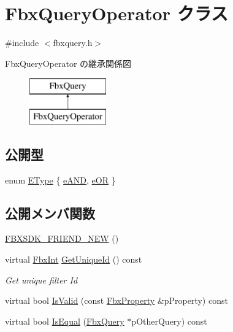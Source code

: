 \hypertarget{class_fbx_query_operator}{}\section{Fbx\+Query\+Operator クラス}
\label{class_fbx_query_operator}


{\ttfamily \#include $<$fbxquery.\+h$>$}

Fbx\+Query\+Operator の継承関係図\begin{figure}[H]
\begin{center}
\leavevmode
\includegraphics[height=2.000000cm]{class_fbx_query_operator}
\end{center}
\end{figure}
\subsection*{公開型}
\begin{DoxyCompactItemize}
\item 
enum \hyperlink{class_fbx_query_operator_aadf25d36a6eab339504a02ce57fd6ad4}{E\+Type} \{ \hyperlink{class_fbx_query_operator_aadf25d36a6eab339504a02ce57fd6ad4ab861a2519f4ff44677b5349143779999}{e\+A\+ND}, 
\hyperlink{class_fbx_query_operator_aadf25d36a6eab339504a02ce57fd6ad4ae85b5273733dbd8dd85f21dc92023cdb}{e\+OR}
 \}
\end{DoxyCompactItemize}
\subsection*{公開メンバ関数}
\begin{DoxyCompactItemize}
\item 
\hyperlink{class_fbx_query_operator_a3cd85ca0a8ff67d6670b36d06dcaf950}{F\+B\+X\+S\+D\+K\+\_\+\+F\+R\+I\+E\+N\+D\+\_\+\+N\+EW} ()
\item 
virtual \hyperlink{fbxtypes_8h_a088fa96de3b0b3ea69f0f6afef525dfb}{Fbx\+Int} \hyperlink{class_fbx_query_operator_a55d021e0103b5e7dc0f8a80e4b468314}{Get\+Unique\+Id} () const
\begin{DoxyCompactList}\small\item\em Get unique filter Id \end{DoxyCompactList}\item 
virtual bool \hyperlink{class_fbx_query_operator_a14dd8a653d1e802f43b60c13d137ccce}{Is\+Valid} (const \hyperlink{class_fbx_property}{Fbx\+Property} \&p\+Property) const
\item 
virtual bool \hyperlink{class_fbx_query_operator_aa96734a4da59286a2cab2832f0529175}{Is\+Equal} (\hyperlink{class_fbx_query}{Fbx\+Query} $\ast$p\+Other\+Query) const
\end{DoxyCompactItemize}
